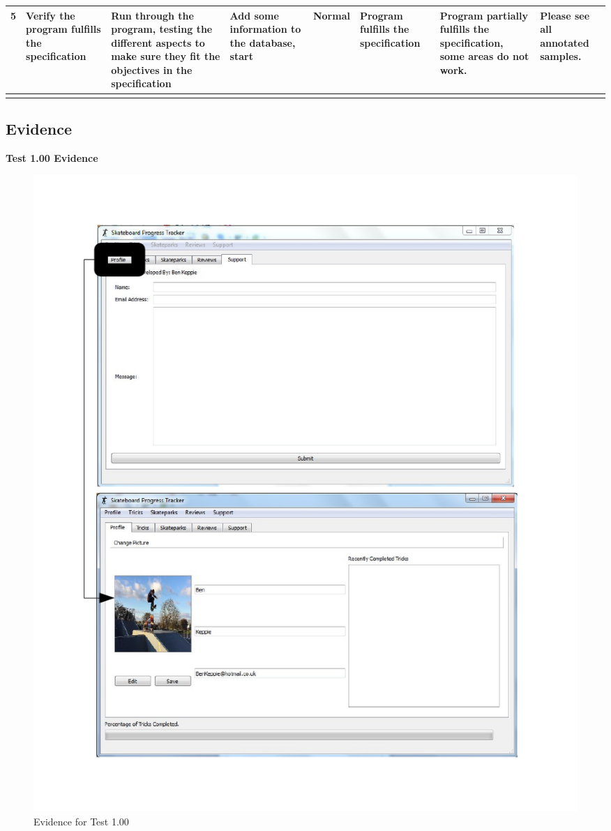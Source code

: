 \begin{landscape}
\begin{center}
\begin{longtable}{|p{1.5cm}|p{2.5cm}|p{2.5cm}|p{2cm}|p{2cm}|p{2cm}|p{2cm}|p{2cm}|}
5 & Verify the program fulfills the specification & Run through the program, testing the different aspects to make sure they fit the objectives in the specification & Add some information to the database, start & Normal & Program fulfills the specification & \textbf{Program partially fulfills the specification, some areas do not work.} & Please see all annotated samples. \\ \hline

\label{tab:Testing}

	\end{longtable}

\end{center}
\end{landscape}


\subsection{Evidence}

\textbf{Test 1.00 Evidence}

\begin{figure}[H]
    \includegraphics[width=\textwidth]{./Testing/AnnotatedSamples/Test100.pdf}
    \caption{Evidence for Test 1.00} \label{fig:Test 1.00}
\end{figure}

